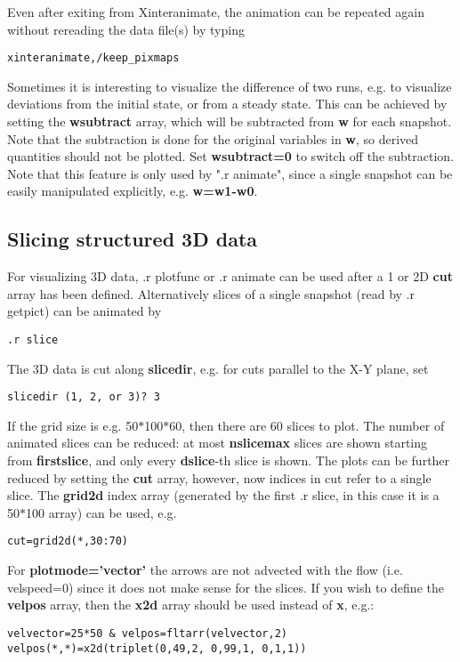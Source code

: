    Even after exiting from Xinteranimate, the animation can be repeated
   again without rereading the data file(s) by typing
\begin{verbatim}
xinteranimate,/keep_pixmaps
\end{verbatim}
   Sometimes it is interesting to visualize the difference of two runs, e.g.
   to visualize deviations from the initial state, or from a steady state.
   This can be achieved by setting the {\bf wsubtract} array, which will be 
   subtracted from {\bf w} for each snapshot. Note that the subtraction is
   done for the original variables in {\bf w}, 
   so derived quantities should not be plotted. 
   Set {\bf wsubtract=0} to switch off the subtraction.
   Note that this feature is only used by ".r animate", since a single 
   snapshot can be easily manipulated explicitly, e.g. {\bf w=w1-w0}.

\subsection{Slicing structured 3D data \label{s-slice}}

   For visualizing 3D data, .r plotfunc or .r animate can be used after a
   1 or 2D {\bf cut} array has been defined. Alternatively slices of a single
   snapshot (read by .r getpict) can be animated by
\begin{verbatim}
.r slice
\end{verbatim}
   The 3D data is cut along {\bf slicedir}, e.g. for cuts parallel to the
   X-Y plane, set
\begin{verbatim}
slicedir (1, 2, or 3)? 3
\end{verbatim}
   If the grid size is e.g. 50$*$100$*$60, then there are 60 slices to plot.
   The number of animated slices can be reduced:
   at most {\bf nslicemax} slices are shown starting from {\bf firstslice},
   and only every {\bf dslice}-th slice is shown.
   The plots can be further reduced by setting the {\bf cut} array,
   however, now indices in cut refer to a single slice. The {\bf grid2d} 
   index array (generated by the first .r slice, in this case it is a 50$*$100 
   array) can be used, e.g.
\begin{verbatim}
cut=grid2d(*,30:70)
\end{verbatim}
   For {\bf plotmode='vector'} the arrows are not advected with the flow 
   (i.e. velspeed=0) since it does not make sense for the slices.
   If you wish to define the {\bf velpos} array, then the 
   {\bf x2d} array should be used instead of {\bf x}, e.g.:
\begin{verbatim}
velvector=25*50 & velpos=fltarr(velvector,2)
velpos(*,*)=x2d(triplet(0,49,2, 0,99,1, 0,1,1))
\end{verbatim}

